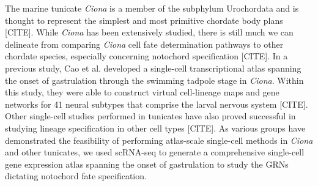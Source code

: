 The marine tunicate \textit{Ciona} is a member of the subphylum Urochordata and is thought to represent the simplest and most primitive chordate body plans [CITE]. While \textit{Ciona} has been extensively studied, there is still much we can delineate from comparing \textit{Ciona} cell fate determination pathways to other chordate species, especially concerning notochord specification [CITE]. In a previous study, Cao et al. developed a single-cell transcriptional atlas spanning the onset of gastrulation through the swimming tadpole stage in \textit{Ciona}. Within this study, they were able to construct virtual cell-lineage maps and gene networks for 41 neural subtypes that comprise the larval nervous system [CITE]. Other single-cell studies performed in tunicates have also proved successful in studying lineage specification in other cell types [CITE]. As various groups have demonstrated the feasibility of performing atlas-scale single-cell methods in \textit{Ciona} and other tunicates, we used scRNA-seq to generate a comprehensive single-cell gene expression atlas spanning the onset of gastrulation to study the GRNs dictating notochord fate specification. 
